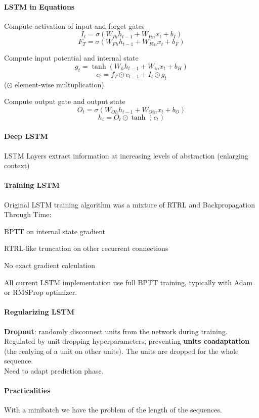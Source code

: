 \documentclass[10pt]{report}
\begin{document}
\paragraph{LSTM in Equations}
\begin{list}{}{}
	\item Compute activation of input and forget gates
	$$I_t=\sigma(W_{Ih}h_{t-1} + W_{Iin}x_t + b_I)$$
	$$F_T=\sigma(W_{Fh}h_{t-1} + W_{Fin}x_t + b_F)$$
	\item Compute input potential and internal state
	$$g_t = \tanh(W_hh_{t-1} + W_{in}x_t + b_H)$$
	$$c_t = f_T\odot c_{t-1} + I_t\odot g_t$$
	($\odot$ element-wise multuplication)
	\item Compute output gate and output state
	$$O_t = \sigma(W_{Oh}h_{t-1} + W_{Oin}x_t + b_O)$$
	$$h_t = O_t\odot\tanh(c_t)$$
\end{list}
\paragraph{Deep LSTM} LSTM Layers extract information at increasing levels of abstraction (enlarging context)
\paragraph{Training LSTM} Original LSTM training algorithm was a mixture of RTRL and Backpropagation Through Time:
\begin{list}{}{}
	\item BPTT on internal state gradient
	\item RTRL-like truncation on other recurrent connections
	\item No exact gradient calculation
\end{list}
All current LSTM implementation use full BPTT training, typically with Adam or RMSProp optimizer.
\paragraph{Regularizing LSTM}\begin{list}{}{}
	\item \textbf{Dropout}: randomly disconnect units from the network during training. Regulated by unit dropping hyperparameters, preventing \textbf{units coadaptation} (the realying of a unit on other units). The units are dropped for the whole sequence.\\Need to adapt prediction phase.
	
\end{list}
\paragraph{Practicalities} With a minibatch we have the problem of the length of the sequences.
\end{document}
